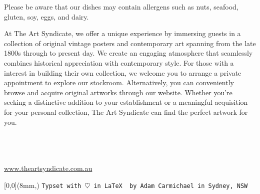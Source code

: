\documentclass[
    pdflatex,
    fontsize=8pt,
    draft=true,
    twoside
]{article}
\begin{document}
\newpage


\newpage

Please be aware that our dishes may contain allergens such as nuts,
seafood, gluten, soy, eggs, and dairy.

\newpage
At The Art Syndicate, we offer a unique experience by immersing guests in a collection of original vintage posters and contemporary art spanning from the late 1800s through to present day. We create an engaging atmosphere that seamlessly combines historical appreciation with contemporary style. For those with a interest in building their own collection, we welcome you to arrange a private appointment to explore our stockroom. Alternatively, you can conveniently browse and acquire original artworks through our website. Whether you're seeking a distinctive addition to your establishment or a meaningful acquisition for your personal collection, The Art Syndicate can find the perfect artwork for you.
\\~\\
\begin{center}
    \\~\\
    \url{www.theartsyndicate.com.au}
\end{center}
\fancyfoot[R]{\footnotesize\DTMnow}
\begin{textblock*}{\linewidth}[0,0](8mm,\dimexpr\paperheight-20mm\relax)
    \footnotesize{
        \texttt{Typset with $\heartsuit$ in \LaTeX~ by Adam Carmichael in Sydney, NSW}
    }
\end{textblock*}
\end{document}
